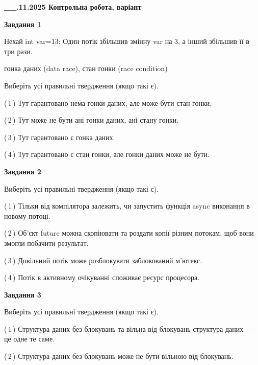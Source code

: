 \documentclass[12pt, ukrainian]{article}
\begin{document}
\begin {large}

\textbf{\_\_.11.2025 Контрольна робота, варіант  }\par


{

\begin{center}
\textbf{Завдання 1}
\end{center}
Нехай int var=13; Один потік збільшив змінну var на 3, а інший збільшив її в три рази.

гонка даних (data race), стан гонки (race condition)

Виберіть усі правильні твердження (якщо такі є).\par
\vspace{2mm}
(\,1\,) Тут гарантовано нема гонки даних, але може бути стан гонки.%

(\,2\,) Тут може не бути ані гонки даних, ані стану гонки.%

(\,3\,) Тут гарантовано є гонка даних.%

(\,4\,) Тут гарантовано є стан гонки, але гонки даних може не бути.%



\begin{center}
\textbf{Завдання 2}
\end{center}
Виберіть усі правильні твердження (якщо такі є).\par
\vspace{2mm}

(\,1\,) Тільки від компілятора залежить, чи запустить функція async виконання в новому потоці.%

(\,2\,) Об’єкт future можна скопіювати та роздати копії різним потокам, щоб вони змогли побачити результат.%

(\,3\,) Довільний потік може розблокувати заблокований м’ютекс.%

(\,4\,) Потік в активному очікуванні споживає ресурс процесора.%



\begin{center}
\textbf{Завдання 3}
\end{center}
Виберіть усі правильні твердження (якщо такі є).\par
\vspace{2mm}

(\,1\,) Структура даних без блокувань та вільна від блокувань структура даних --- це одне те саме.%

(\,2\,) Структура даних без блокувань може не бути вільною від блокувань.%

}
\end{large}
\end{document}
